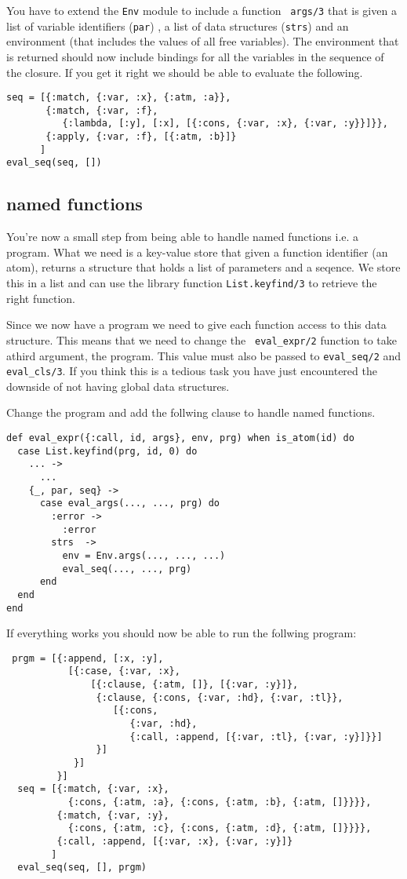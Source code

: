 \documentclass[a4paper,11pt]{article}
\begin{document}
You have to extend the {\tt Env} module to include a function {\tt
  args/3} that is given a list of variable identifiers ({\tt par}) , a
list of data structures ({\tt strs}) and an environment (that includes
the values of all free variables). The environment that is returned
should now include bindings for all the variables in the sequence of
the closure. If you get it right we should be able to evaluate the
following.

\begin{verbatim}
seq = [{:match, {:var, :x}, {:atm, :a}},
       {:match, {:var, :f}, 
          {:lambda, [:y], [:x], [{:cons, {:var, :x}, {:var, :y}}]}},
       {:apply, {:var, :f}, [{:atm, :b}]}
      ]
eval_seq(seq, [])

\end{verbatim}

\subsection{named functions}

You're now a small step from being able to handle named functions
i.e. a program. What we need is a key-value store that given a
function identifier (an atom), returns a structure that holds a list
of parameters and a seqence. We store this in a list and can use the
library function {\tt List.keyfind/3} to retrieve the right function.

Since we now have a program we need to give each function access to
this data structure. This means that we need to change the {\tt
  eval_expr/2} function to take athird argument, the program. This
value must also be passed to {\tt eval_seq/2} and {\tt eval_cls/3}. If
you think this is a tedious task you have just encountered the
downside of not having global data structures.

Change the program and add the follwing clause to handle named
functions.

\begin{verbatim}
def eval_expr({:call, id, args}, env, prg) when is_atom(id) do
  case List.keyfind(prg, id, 0) do
    ... ->
      ...
    {_, par, seq} ->
      case eval_args(..., ..., prg) do
        :error ->
          :error
        strs  ->
          env = Env.args(..., ..., ...)
          eval_seq(..., ..., prg)
      end
  end
end
\end{verbatim}

If everything works you should now be able to run the follwing program:

\begin{verbatim}
 prgm = [{:append, [:x, :y],
           [{:case, {:var, :x}, 
               [{:clause, {:atm, []}, [{:var, :y}]},
                {:clause, {:cons, {:var, :hd}, {:var, :tl}}, 
                   [{:cons, 
                      {:var, :hd}, 
                      {:call, :append, [{:var, :tl}, {:var, :y}]}}]
                }]
            }]
         }]
  seq = [{:match, {:var, :x}, 
           {:cons, {:atm, :a}, {:cons, {:atm, :b}, {:atm, []}}}},
         {:match, {:var, :y}, 
           {:cons, {:atm, :c}, {:cons, {:atm, :d}, {:atm, []}}}},
         {:call, :append, [{:var, :x}, {:var, :y}]}
        ]
  eval_seq(seq, [], prgm)
\end{verbatim}
\end{document}
